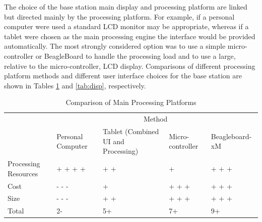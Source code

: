 \documentclass[11pt]{article} %
\begin{document}
\quad \newline
The choice of the base station main display and processing platform are linked but directed mainly by the processing platform. For example, if a personal computer were used a standard LCD monitor may be appropriate, whereas if a tablet were chosen as the main processing engine the interface would be provided automatically. The most strongly considered option was to use a simple micro-controller or BeagleBoard to handle the processing load and to use a large, relative to the micro-controller, LCD display. Comparisons of different processing platform methods and different user interface choices for the base station are shown in Tables \ref{tab:proc} and \ref{tab:disp}, respectively.
\begin{table}[h!]
\caption{Comparison of Main Processing Platforms}
\begin{tabular}{| p{1.5in} | p{.75in} | p{1.5in} | p{0.75in} | p{1.15in} | }
\cline{2-5}
\multicolumn{1}{c}{}&\multicolumn{4}{|c|}{Method} \\
\cline{2-5}
\multicolumn{1}{c|}{}&Personal \newline Computer&Tablet (Combined UI \newline and Processing)&Micro-controller & Beagleboard-xM\\
\hline
Processing Resources&+ + + +&+ +&+&+ + +\\
\hline
Cost &- - -& + &+ + +&+ + +\\
\hline
Size&- - -&+ +&+ + +& + + +\\
\hline
\hline
Total &2-&5+&7+& 9+\\
\hline
\end{tabular}
\label{tab:proc}
\end{table}
\end{document}
